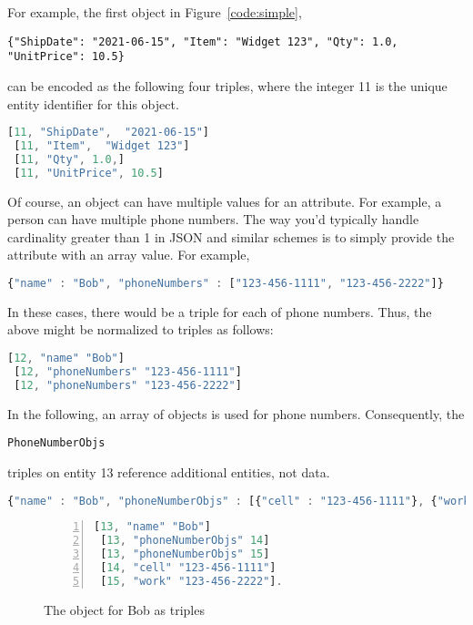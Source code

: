 \documentclass[9pt,letterpaper]{article}
\newcommand{\stt}[1]{\begin{footnotesize}\texttt{#1}\end{footnotesize}}
\begin{document}
For example, the first object in Figure~\ref{code:simple}, \stt{\{"ShipDate":  "2021-06-15", "Item":  "Widget 123", "Qty": 1.0, "UnitPrice": 10.5\}} can be encoded as
the following four triples, where the integer 11 is the unique entity identifier for this object.

\begin{lstlisting}[language=JavaScript,basicstyle=\ttfamily\scriptsize]
 [11, "ShipDate",  "2021-06-15"]
 [11, "Item",  "Widget 123"]
 [11, "Qty", 1.0,]
 [11, "UnitPrice", 10.5]
\end{lstlisting}

Of course, an object can have multiple values for an attribute.
For example, a person can have multiple phone numbers.
The way you'd typically handle cardinality greater than 1 in JSON and similar schemes is to simply provide the attribute with an array value.
For example,

\begin{lstlisting}[language=JavaScript,basicstyle=\ttfamily\scriptsize]
 {"name" : "Bob", "phoneNumbers" : ["123-456-1111", "123-456-2222"]}
\end{lstlisting}

In these cases, there would be a triple for each of phone numbers.
Thus, the above might be normalized to triples as follows:

\begin{lstlisting}[language=JavaScript,basicstyle=\ttfamily\scriptsize]
 [12, "name" "Bob"]
 [12, "phoneNumbers" "123-456-1111"]
 [12, "phoneNumbers" "123-456-2222"]
\end{lstlisting}

In the following, an array of objects is used for phone numbers.
Consequently, the \stt{PhoneNumberObjs} triples on entity 13 reference additional entities, not data.

\begin{lstlisting}[language=JavaScript,basicstyle=\ttfamily\scriptsize]
{"name" : "Bob", "phoneNumberObjs" : [{"cell" : "123-456-1111"}, {"work" : "123-456-2222"}]}
\end{lstlisting}

\begin{figure}[H]
  \caption{The object for Bob as triples}
  \label{code:bob-phone}
\begin{lstlisting}[language=JavaScript,numberstyle=\scriptsize,basicstyle=\ttfamily\scriptsize,numbers=left,stepnumber=1,breaklines=true]
 [13, "name" "Bob"]
 [13, "phoneNumberObjs" 14]
 [13, "phoneNumberObjs" 15]
 [14, "cell" "123-456-1111"]
 [15, "work" "123-456-2222"].
\end{lstlisting}
\end{figure}
\end{document}
